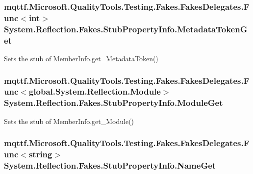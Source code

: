 \hypertarget{class_system_1_1_reflection_1_1_fakes_1_1_stub_property_info_aac86b19b358c16618c2b4265be88d635}{
\subsubsection[{Metadata\-Token\-Get}]{\setlength{\rightskip}{0pt plus 5cm}mqttf.\-Microsoft.\-Quality\-Tools.\-Testing.\-Fakes.\-Fakes\-Delegates.\-Func$<$int$>$ System.\-Reflection.\-Fakes.\-Stub\-Property\-Info.\-Metadata\-Token\-Get}}\label{class_system_1_1_reflection_1_1_fakes_1_1_stub_property_info_aac86b19b358c16618c2b4265be88d635}


Sets the stub of Member\-Info.\-get\-\_\-\-Metadata\-Token()

\hypertarget{class_system_1_1_reflection_1_1_fakes_1_1_stub_property_info_a0c0612b33d03bc4a54089cf9088e84e9}{
\subsubsection[{Module\-Get}]{\setlength{\rightskip}{0pt plus 5cm}mqttf.\-Microsoft.\-Quality\-Tools.\-Testing.\-Fakes.\-Fakes\-Delegates.\-Func$<$global.\-System.\-Reflection.\-Module$>$ System.\-Reflection.\-Fakes.\-Stub\-Property\-Info.\-Module\-Get}}\label{class_system_1_1_reflection_1_1_fakes_1_1_stub_property_info_a0c0612b33d03bc4a54089cf9088e84e9}


Sets the stub of Member\-Info.\-get\-\_\-\-Module()

\hypertarget{class_system_1_1_reflection_1_1_fakes_1_1_stub_property_info_a21b57274dc84cf0fb89e3a8599c774bf}{
\subsubsection[{Name\-Get}]{\setlength{\rightskip}{0pt plus 5cm}mqttf.\-Microsoft.\-Quality\-Tools.\-Testing.\-Fakes.\-Fakes\-Delegates.\-Func$<$string$>$ System.\-Reflection.\-Fakes.\-Stub\-Property\-Info.\-Name\-Get}}\label{class_system_1_1_reflection_1_1_fakes_1_1_stub_property_info_a21b57274dc84cf0fb89e3a8599c774bf}


